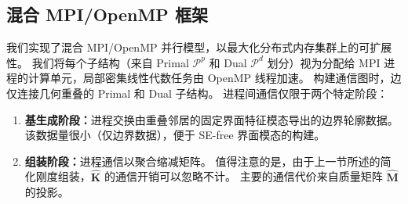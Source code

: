 \subsection{混合 MPI/OpenMP 框架}
我们实现了混合 MPI/OpenMP 并行模型，以最大化分布式内存集群上的可扩展性。
我们将每个子结构（来自 Primal $\mathcal{P}^p$ 和 Dual $\mathcal{P}^d$ 划分）视为分配给 MPI 进程的计算单元，局部密集线性代数任务由 OpenMP 线程加速。
构建通信图时，边仅连接几何重叠的 Primal 和 Dual 子结构。
进程间通信仅限于两个特定阶段：
\begin{enumerate}
    \item \textbf{基生成阶段：}进程交换由重叠邻居的固定界面特征模态导出的边界轮廓数据。该数据量很小（仅边界数据），便于 SE-free 界面模态的构建。
    \item \textbf{组装阶段：}进程通信以聚合缩减矩阵。
    值得注意的是，由于上一节所述的简化刚度组装，$\hat{\mathbf{K}}$ 的通信开销可以忽略不计。
    主要的通信代价来自质量矩阵 $\hat{\mathbf{M}}$ 的投影。
\end{enumerate}







